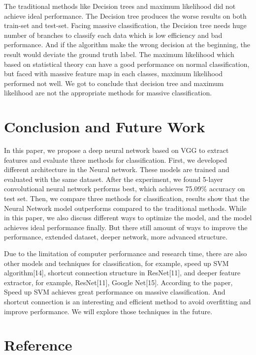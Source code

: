 \documentclass[runningheads]{llncs}
\begin{document}
The traditional methods like Decision trees and maximum likelihood did not achieve ideal performance. The Decision tree produces the worse results on both train-set and test-set. Facing massive classification, the Decision tree needs huge number of branches to classify each data which is low efficiency and bad performance. And if the algorithm make the wrong decision at the beginning, the result would deviate the ground truth label. The maximum likelihood which based on statistical theory can have a good performance on normal classification, but faced with massive feature map in each classes, maximum likelihood performed not well. We got to conclude that decision tree and maximum likelihood are not the appropriate methods for massive classification.

\section{Conclusion and Future Work}
In this paper, we propose a deep neural network based on VGG to extract features and evaluate three methods for classification. First, we developed different architecture in the Neural network. These models are trained and evaluated with the same dataset. After the experiment, we found 5-layer convolutional neural network performs best, which achieves 75.09\% accuracy on test set. Then, we compare three methods for classification, results show that the Neural Network model outperforms compared to the traditional methods. While in this paper, we also discuss different ways to optimize the model, and the model achieves ideal performance finally. But there still amount of ways to improve the performance, extended dataset, deeper network, more advanced structure.

Due to the limitation of computer performance and research time, there are also other models and techniques for classification, for example, speed up SVM algorithm[14], shortcut connection structure in ResNet[11], and deeper feature extractor, for example, ResNet[11], Google Net[15]. According to the paper, Speed up SVM achieves great performance on massive classification. And shortcut connection is an interesting and efficient method to avoid overfitting and improve performance. We will explore those techniques in the future.

\section{Reference}
\end{document}
